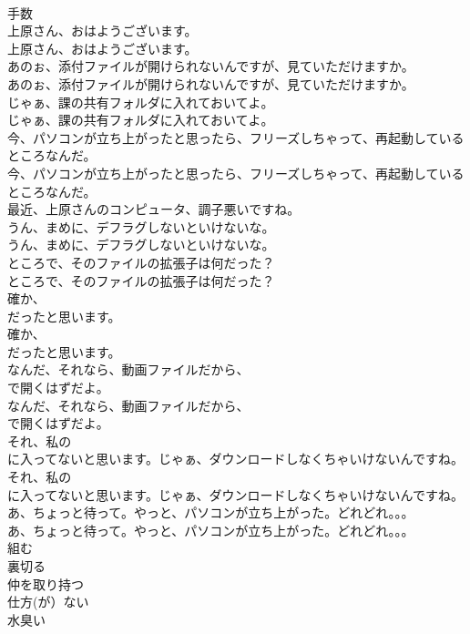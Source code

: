 \documentclass[8pt]{extreport}
\begin{document}
\begin{CJK}{UTF8}{min}
\\	手数
\\	上原さん、おはようございます。	
\\	上原さん、おはようございます。 
\\	あのぉ、添付ファイルが開けられないんですが、見ていただけますか。	
\\	あのぉ、添付ファイルが開けられないんですが、見ていただけますか。 
\\	じゃぁ、課の共有フォルダに入れておいてよ。	
\\	じゃぁ、課の共有フォルダに入れておいてよ。 
\\	今、パソコンが立ち上がったと思ったら、フリーズしちゃって、再起動しているところなんだ。	
\\	今、パソコンが立ち上がったと思ったら、フリーズしちゃって、再起動しているところなんだ。 
\\	最近、上原さんのコンピュータ、調子悪いですね。 
\\	うん、まめに、デフラグしないといけないな。	
\\	うん、まめに、デフラグしないといけないな。 
\\	ところで、そのファイルの拡張子は何だった？	
\\	ところで、そのファイルの拡張子は何だった？ 
\\	確か、
\\	だったと思います。	
\\	確か、
\\	だったと思います。 
\\	なんだ、それなら、動画ファイルだから、
\\	で開くはずだよ。	
\\	なんだ、それなら、動画ファイルだから、
\\	で開くはずだよ。 
\\	それ、私の
\\	に入ってないと思います。じゃぁ、ダウンロードしなくちゃいけないんですね。	
\\	それ、私の
\\	に入ってないと思います。じゃぁ、ダウンロードしなくちゃいけないんですね。 
\\	あ、ちょっと待って。やっと、パソコンが立ち上がった。どれどれ。。。	
\\	あ、ちょっと待って。やっと、パソコンが立ち上がった。どれどれ。。。 
\\	組む
\\	裏切る
\\	仲を取り持つ
\\	仕方(が）ない
\\	水臭い

\end{CJK}
\end{document}
